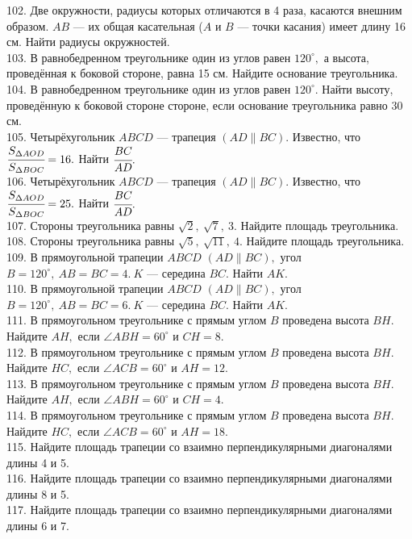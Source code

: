 102. Две окружности, радиусы которых отличаются в 4 раза, касаются внешним образом. $AB$ --- их общая касательная ($A$ и $B$ --- точки касания) имеет длину 16 см. Найти радиусы окружностей.\\
103. В равнобедренном треугольнике один из углов равен $120^\circ,$ а высота, проведённая к боковой стороне, равна 15 см. Найдите основание треугольника.\\
104. В равнобедренном треугольнике один из углов равен $120^\circ.$ Найти высоту, проведённую к боковой стороне стороне, если основание треугольника равно 30 см.\\
105. Четырёхугольник $ABCD$ --- трапеция $(AD\parallel BC).$ Известно, что $\cfrac{S_{\Delta AOD}}{S_{\Delta BOC}}=16.$ Найти $\cfrac{BC}{AD}.$\\
106. Четырёхугольник $ABCD$ --- трапеция $(AD\parallel BC).$ Известно, что $\cfrac{S_{\Delta AOD}}{S_{\Delta BOC}}=25.$ Найти $\cfrac{BC}{AD}.$\\
107. Стороны треугольника равны $\sqrt{2},\ \sqrt{7},\ 3.$ Найдите площадь треугольника.\\
108. Стороны треугольника равны $\sqrt{5},\ \sqrt{11},\ 4.$ Найдите площадь треугольника.\\
109. В прямоугольной трапеции $ABCD$ $(AD\parallel BC),$ угол $B=120^\circ,\ AB=BC=4.\ K$ --- середина $BC.$ Найти $AK.$\\
110. В прямоугольной трапеции $ABCD$ $(AD\parallel BC),$ угол $B=120^\circ,\ AB=BC=6.\ K$ --- середина $BC.$ Найти $AK.$\\
111. В прямоугольном треугольнике с прямым углом $B$ проведена высота $BH.$ Найдите $AH,$ если $\angle ABH=60^\circ$ и $CH=8.$\\
112. В прямоугольном треугольнике с прямым углом $B$ проведена высота $BH.$ Найдите $HC,$ если $\angle ACB=60^\circ$ и $AH=12.$\\
113. В прямоугольном треугольнике с прямым углом $B$ проведена высота $BH.$ Найдите $AH,$ если $\angle ABH=60^\circ$ и $CH=4.$\\
114. В прямоугольном треугольнике с прямым углом $B$ проведена высота $BH.$ Найдите $HC,$ если $\angle ACB=60^\circ$ и $AH=18.$\\
115. Найдите площадь трапеции со взаимно перпендикулярными диагоналями длины 4 и 5.\\
116. Найдите площадь трапеции со взаимно перпендикулярными диагоналями длины 8 и 5.\\
117. Найдите площадь трапеции со взаимно перпендикулярными диагоналями длины 6 и 7.\\
